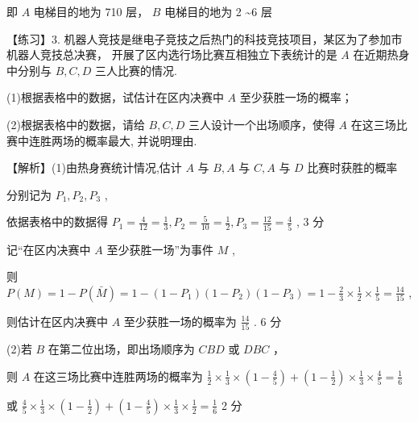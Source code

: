 \documentclass[10pt]{article}
\begin{document}
即 \(A\) 电梯目的地为 710 层， \(B\) 电梯目的地为 2 \textasciitilde  6 层

【练习】3. 机器人竞技是继电子竞技之后热门的科技竞技项目，某区为了参加市机器人竞技总决赛， 开展了区内选行场比赛互相独立下表统计的是 \(A\) 在近期热身中分别与 \(B,C,D\) 三人比赛的情况.

\begin{center}
\end{center}

(1)根据表格中的数据，试估计在区内决赛中 \(A\) 至少获胜一场的概率；

(2)根据表格中的数据，请给 \(B,C,D\) 三人设计一个出场顺序，使得 \(A\) 在这三场比赛中连胜两场的概率最大, 并说明理由.

【解析】(1)由热身赛统计情况,估计 \(A\) 与 \(B,A\) 与 \(C,A\) 与 \(D\) 比赛时获胜的概率

分别记为 \({P}_{1},{P}_{2},{P}_{3}\) ,

依据表格中的数据得 \({P}_{1} = \frac{4}{12} = \frac{1}{3},{P}_{2} = \frac{5}{10} = \frac{1}{2},{P}_{3} = \frac{12}{15} = \frac{4}{5}\) , 3 分

记“在区内决赛中 \(A\) 至少获胜一场”为事件 \(M\) ,

则 \(P\left( M\right)  = 1 - P\left( \bar{M}\right)  = 1 - \left( {1 - {P}_{1}}\right) \left( {1 - {P}_{2}}\right) \left( {1 - {P}_{3}}\right)  = 1 - \frac{2}{3} \times  \frac{1}{2} \times  \frac{1}{5} = \frac{14}{15}\) ,

则估计在区内决赛中 \(A\) 至少获胜一场的概率为 \(\frac{14}{15}\) . 6 分

(2)若 \(B\) 在第二位出场，即出场顺序为 \({CBD}\) 或 \({DBC}\) ，

则 \(A\) 在这三场比赛中连胜两场的概率为 \(\frac{1}{2} \times  \frac{1}{3} \times  \left( {1 - \frac{4}{5}}\right)  + \left( {1 - \frac{1}{2}}\right)  \times  \frac{1}{3} \times  \frac{4}{5} = \frac{1}{6}\)

或 \(\frac{4}{5} \times  \frac{1}{3} \times  \left( {1 - \frac{1}{2}}\right)  + \left( {1 - \frac{4}{5}}\right)  \times  \frac{1}{3} \times  \frac{1}{2} = \frac{1}{6}\) 2 分
\end{document}
